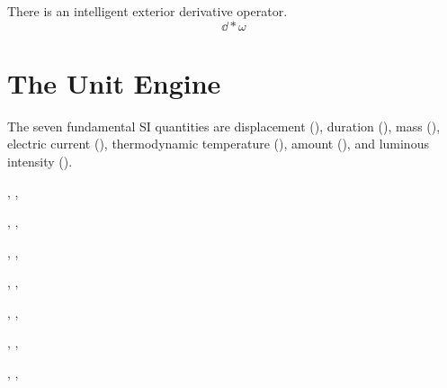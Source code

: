 \documentclass{article}
\begin{document}
There is an intelligent exterior derivative operator. 
\[
  \dd*\omega
\]
\restoregeometry

\section{The Unit Engine}
The seven fundamental SI quantities are displacement (), duration (),
mass (), electric current (), thermodynamic temperature (), 
amount (), and luminous intensity (). 


,
,

,
,

,
,

\begin{usebaseunit}
  , , 
\end{usebaseunit}

\begin{usederivedunit}
  , , 
\end{usederivedunit}

\begin{usealternativeunit}
  , , 
\end{usealternativeunit}

\momentumonlybaseunit, \momentumonlyderivedunit, \momentumonlyalternativeunit
\end{document}
